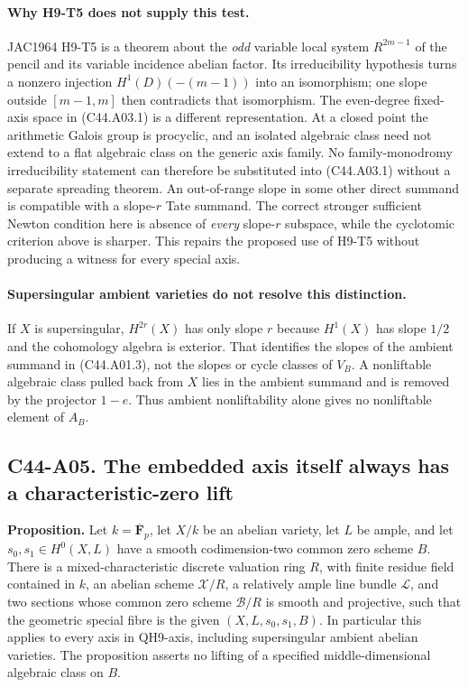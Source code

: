 \paragraph{Why H9-T5 does not supply this test.}
JAC1964 H9-T5 is a theorem about the \emph{odd} variable local
system $R^{2m-1}$ of the pencil and its variable incidence abelian
factor. Its irreducibility hypothesis turns a nonzero injection
$H^1(D)(-(m-1))$ into an isomorphism; one slope outside
$[m-1,m]$ then contradicts that isomorphism. The even-degree
fixed-axis space in (C44.A03.1) is a different representation.
At a closed point the arithmetic Galois group is procyclic, and
an isolated algebraic class need not extend to a flat algebraic
class on the generic axis family. No family-monodromy
irreducibility statement can therefore be substituted into
(C44.A03.1) without a separate spreading theorem.
An out-of-range slope in some other direct summand is compatible
with a slope-$r$ Tate summand. The correct stronger sufficient
Newton condition here is absence of \emph{every} slope-$r$
subspace, while the cyclotomic criterion above is sharper.
This repairs the proposed use of H9-T5 without producing a
witness for every special axis.

\paragraph{Supersingular ambient varieties do not resolve this distinction.}
If $X$ is supersingular, $H^{2r}(X)$ has only slope $r$ because
$H^1(X)$ has slope $1/2$ and the cohomology algebra is exterior.
That identifies the slopes of the ambient summand in
(C44.A01.3), not the slopes or cycle classes of $V_B$.
A nonliftable algebraic class pulled back from $X$ lies in the
ambient summand and is removed by the projector $1-e$. Thus
ambient nonliftability alone gives no nonliftable element of
$A_B$.

\subsection*{C44-A05. The embedded axis itself always has a characteristic-zero lift}

\textbf{Proposition.}
Let $k=\overline{\mathbf F}_p$, let $X/k$ be an abelian variety,
let $L$ be ample, and let $s_0,s_1\in H^0(X,L)$ have a smooth
codimension-two common zero scheme $B$. There is a mixed-characteristic
discrete valuation ring $R$, with finite residue field contained in $k$,
an abelian scheme $\mathcal X/R$, a relatively ample line bundle
$\mathcal L$, and two sections whose common zero scheme
$\mathcal B/R$ is smooth and projective, such that the geometric
special fibre is the given $(X,L,s_0,s_1,B)$. In particular this
applies to every axis in QH9-axis, including supersingular ambient
abelian varieties. The proposition asserts no lifting of a specified
middle-dimensional algebraic class on $B$.

